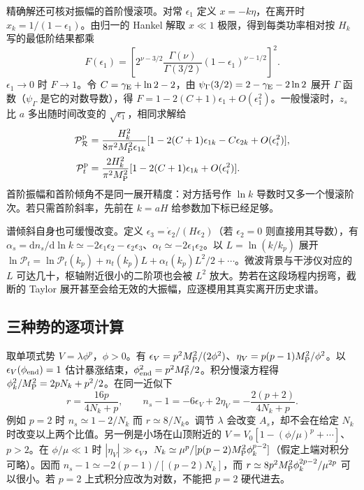 精确解还可核对振幅的首阶慢滚项。对常 $\epsilon_1$ 定义 $x=-k\eta$，在离开时 $x_k=1/(1-\epsilon_1)$。由归一的 Hankel 解取 $x\ll1$ 极限，得到每类功率相对按 $H_k$ 写的最低阶结果都乘
\[
 F(\epsilon_1)=
 \left[2^{\nu-3/2}\frac{\Gamma(\nu)}{\Gamma(3/2)}
             (1-\epsilon_1)^{\nu-1/2}\right]^2 .
\]
$\epsilon_1\to0$ 时 $F\to1$。令 $C=\gamma_{\rm E}+\ln2-2$，由 $\psi_{\Gamma}(3/2)=2-\gamma_{\rm E}-2\ln2$ 展开 $\Gamma$ 函数（$\psi_{\Gamma}$ 是它的对数导数），得 $F=1-2(C+1)\epsilon_1+O(\epsilon_1^2)$。一般慢滚时，$z_s$ 比 $a$ 多出随时间改变的 $\sqrt{\epsilon_1}$，相同求解给
\begin{align*}
 \mathcal P_{\mathcal R}^{\rm p}
 &=\frac{H_k^2}{8\pi^2M_{\rm P}^2\epsilon_{1k}}
    [1-2(C+1)\epsilon_{1k}-C\epsilon_{2k}+O(\epsilon_i^2)],\\
 \mathcal P_t^{\rm p}
 &=\frac{2H_k^2}{\pi^2M_{\rm P}^2}
    [1-2(C+1)\epsilon_{1k}+O(\epsilon_i^2)] .
\end{align*}
首阶振幅和首阶倾角不是同一展开精度：对方括号作 $\ln k$ 导数时又多一个慢滚阶次。若只需首阶斜率，先前在 $k=aH$ 给参数加下标已经足够。

谱倾斜自身也可缓慢改变。定义 $\epsilon_3=\dot\epsilon_2/(H\epsilon_2)$（若 $\epsilon_2=0$ 则直接用其导数），有 $\alpha_s=\mathrm dn_s/\mathrm d\ln k\simeq-2\epsilon_1\epsilon_2-\epsilon_2\epsilon_3$、$\alpha_t\simeq-2\epsilon_1\epsilon_2$。以 $L=\ln(k/k_p)$ 展开 $\ln\mathcal P_t=\ln\mathcal P_t(k_p)+n_t(k_p)L+\alpha_t(k_p)L^2/2+\cdots$。微波背景与干涉仪对应的 $L$ 可达几十，枢轴附近很小的二阶项也会被 $L^2$ 放大。势若在这段场程内拐弯，截断的 Taylor 展开甚至会给无效的大振幅，应逐模用其真实离开历史求谱。
\subsection{三种势的逐项计算}

取单项式势 $V=\lambda\phi^p$，$\phi>0$。有 $\epsilon_V=p^2M_{\rm P}^2/(2\phi^2)$、$\eta_V=p(p-1)M_{\rm P}^2/\phi^2$。以 $\epsilon_V(\phi_{\rm end})=1$ 估计暴涨结束，$\phi_{\rm end}^2=p^2M_{\rm P}^2/2$。积分慢滚方程得 $\phi_k^2/M_{\rm P}^2=2pN_k+p^2/2$。在同一近似下
\[
 r=\frac{16p}{4N_k+p},\qquad
 n_s-1=-6\epsilon_V+2\eta_V=-\frac{2(p+2)}{4N_k+p}.
\]
例如 $p=2$ 时 $n_s\simeq1-2/N_k$ 而 $r\simeq8/N_k$。调节 $\lambda$ 会改变 $A_s$，却不会在给定 $N_k$ 时改变以上两个比值。另一例是小场在山顶附近的 $V=V_0[1-(\phi/\mu)^p+\cdots]$、$p>2$。在 $\phi/\mu\ll1$ 时 $|\eta_V|\gg\epsilon_V$，$N_k\simeq\mu^p/[p(p-2)M_{\rm P}^2\phi_k^{p-2}]$（假定上端对积分可略）。因而 $n_s-1\simeq-2(p-1)/[(p-2)N_k]$，而 $r\simeq8p^2M_{\rm P}^2\phi_k^{2p-2}/\mu^{2p}$ 可以很小。若 $p=2$ 上式积分应改为对数，不能把 $p=2$ 硬代进去。

